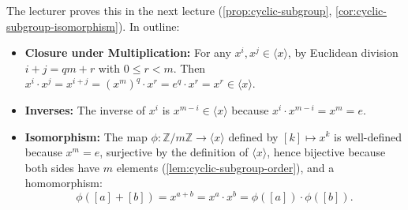 \begin{content}
\begin{steps}
The lecturer proves this in the next lecture (\cref{prop:cyclic-subgroup}, \cref{cor:cyclic-subgroup-isomorphism}). In outline:
\begin{itemize}
    \item \textbf{Closure under Multiplication:} For any $x^i, x^j \in \langle x \rangle$, by Euclidean division $i + j = q m + r$ with $0 \le r < m$. Then $x^i \cdot x^j = x^{i+j} = (x^m)^q \cdot x^r = e^q \cdot x^r = x^r \in \langle x \rangle$.
    \item \textbf{Inverses:} The inverse of $x^i$ is $x^{m-i} \in \langle x \rangle$ because $x^i \cdot x^{m-i} = x^m = e$.
    \item \textbf{Isomorphism:} The map $\phi \colon \mathbb{Z}/m\mathbb{Z} \to \langle x \rangle$ defined by $[k] \mapsto x^k$ is well-defined because $x^m = e$, surjective by the definition of $\langle x \rangle$, hence bijective because both sides have $m$ elements (\cref{lem:cyclic-subgroup-order}), and a homomorphism:
    \[
    \phi([a] + [b]) = x^{a+b} = x^a \cdot x^b = \phi([a]) \cdot \phi([b]).
    \]
\end{itemize}
\end{steps}
\end{content}

